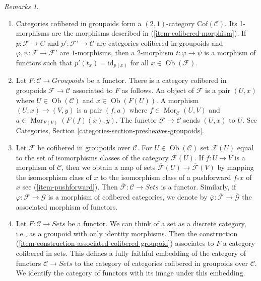 \documentclass{stacks-project}
\theoremstyle{plain}
\theoremstyle{definition}
\theoremstyle{remark}
\newtheorem{remarks}[subsection]{Remarks}
\numberwithin{equation}{subsection}
\def\Mor{\mathop{\mathrm{Mor}}\nolimits}
\def\Ob{\mathop{\mathrm{Ob}}\nolimits}
\begin{document}
\begin{remarks}
\begin{enumerate}
\item
\label{item-definition-cofibered-groupoids-2-category}
Categories cofibered in groupoids form a $(2, 1)$-category
$\text{Cof}(\mathcal{C})$. Its 1-morphisms are the morphisms described in
(\ref{item-cofibered-morphism}). If $p : \mathcal{F} \to C$ and
$p': \mathcal{F}' \to \mathcal{C}$ are categories cofibered in groupoids
and $\varphi, \psi : \mathcal{F} \to \mathcal{F}'$ are $1$-morphisms, then
a 2-morphism $t : \varphi \to \psi$ is a morphism of functors such that
$p'(t_x) = \text{id}_{p(x)}$ for all $x \in \Ob(\mathcal{F})$.
\item
\label{item-construction-associated-cofibered-groupoid}
Let $F : \mathcal{C} \to \textit{Groupoids}$ be a functor. There
is a category cofibered in groupoids $\mathcal{F} \to \mathcal{C}$
associated to $F$ as follows. An object of $\mathcal{F}$ is a pair $(U, x)$
where $U \in \Ob(\mathcal{C})$ and $x \in \Ob(F(U))$. A
morphism $(U, x) \to (V, y)$ is a pair $(f, a)$ where
$f \in \Mor_\mathcal{C}(U, V)$ and
$a \in \Mor_{F(V)}(F(f)(x), y)$.
The functor $\mathcal{F} \to \mathcal{C}$ sends $(U, x)$ to $U$. See
Categories, Section \ref{categories-section-presheaves-groupoids}.
\item
\label{item-associated-functor-isomorphism-classes}
Let $\mathcal{F}$ be cofibered in groupoids over $\mathcal{C}$.
For $U \in \Ob(\mathcal{C})$ set $\overline{\mathcal{F}}(U)$ equal to
the set of isomorphisms classes of the category $\mathcal{F}(U)$.
If $f : U \to V$ is a morphism of $\mathcal{C}$, then we obtain a
map of sets $\overline{\mathcal{F}}(U) \to \overline{\mathcal{F}}(V)$ by
mapping the isomorphism class of $x$ to the isomorphism class of a pushforward
$f_*x$ of $x$ see (\ref{item-pushforward}). Then
$\overline{\mathcal{F}} : \mathcal{C} \to \textit{Sets}$ is a
functor. Similarly, if $\varphi : \mathcal{F} \to \mathcal{G}$ is a
morphism of cofibered categories, we denote by
$\overline{\varphi}: \overline{\mathcal{F}} \to  \overline{\mathcal{G}}$
the associated morphism of functors.
\item
\label{item-convention-cofibered-sets}
Let $F: \mathcal{C} \to \textit{Sets}$ be a functor. We can think of a
set as a discrete category, i.e., as a groupoid with only identity morphisms.
Then the construction (\ref{item-construction-associated-cofibered-groupoid})
associates to $F$ a category cofibered in sets. This defines a fully
faithful embedding of the category of functors $\mathcal{C} \to \textit{Sets}$
to the category of categories cofibered in groupoids over $\mathcal{C}$.
We identify the category of functors with its image under this embedding.

\end{enumerate}
\end{remarks}
\end{document}
